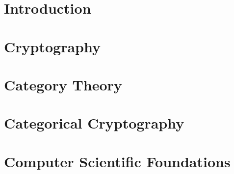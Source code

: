 \documentclass[12pt,twoside]{reedthesis}
\begin{document}



\tableofcontents

%



\mainmatter%
\pagestyle{fancyplain} %

\chapter*{Introduction}


\chapter{Cryptography}
\label{chap:cryptography}


\chapter{Category Theory}
\label{chap:category-theory}


\chapter{Categorical Cryptography}
\label{chap:categorical-cryptography}


\appendix
\chapter{Computer Scientific Foundations}
\label{chap:cs-theory}


\backmatter{}
\nocite{*}
\printbibliography


\end{document}
